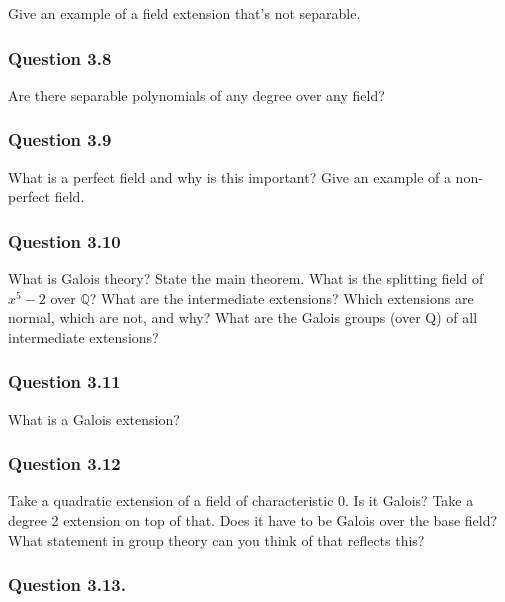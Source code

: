 Give an example of a field extension that's not separable.

\hypertarget{question-3.8}{%
\subsubsection{Question 3.8}\label{question-3.8}}

Are there separable polynomials of any degree over any field?

\hypertarget{question-3.9}{%
\subsubsection{Question 3.9}\label{question-3.9}}

What is a perfect field and why is this important? Give an example of a
non-perfect field.

\hypertarget{question-3.10}{%
\subsubsection{Question 3.10}\label{question-3.10}}

What is Galois theory? State the main theorem. What is the splitting
field of \(x^5 - 2\) over \({\mathbb{Q}}\)? What are the intermediate
extensions? Which extensions are normal, which are not, and why? What
are the Galois groups (over Q) of all intermediate extensions?

\hypertarget{question-3.11}{%
\subsubsection{Question 3.11}\label{question-3.11}}

What is a Galois extension?

\hypertarget{question-3.12}{%
\subsubsection{Question 3.12}\label{question-3.12}}

Take a quadratic extension of a field of characteristic 0. Is it Galois?
Take a degree 2 extension on top of that. Does it have to be Galois over
the base field? What statement in group theory can you think of that
reﬂects this?

\hypertarget{question-3.13.}{%
\subsubsection{Question 3.13.}\label{question-3.13.}}

